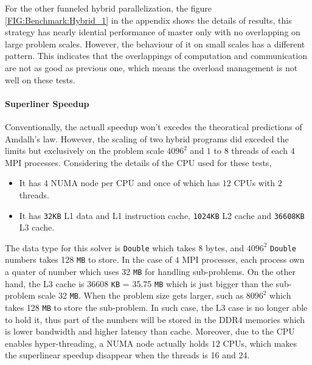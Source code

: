 For the other funneled hybrid parallelization, the figure 
            \ref{FIG:Benchmark:Hybrid_1} 
in the appendix shows the details of results,
this strategy has nearly idential performance of master only with no overlapping on large problem scales.
However, the behaviour of it on small scales has a different pattern.
This indicates that the overlappings of computation and communication are not as good as previous one, which means the overload management is not 
well on these tests.


\paragraph{Superliner Speedup}
Conventionally, the actuall speedup won't excedes the theoratical predictions of Amdalh's law.
However, the scaling of two hybrid programs did exceded the limits but exclusively on the problem scale $4096^2$ and $1$ to $8$ threads of each $4$ MPI processes.
Considering the details of the CPU used for these tests, 
\begin{itemize}
  \item It has $4$ NUMA node per CPU and once of which has $12$ CPUs with $2$ threads.
  \item It has \texttt{32KB} L1 data and L1 instruction cache, \texttt{1024KB} L2 cache and \texttt{36608KB} L3 cache.
\end{itemize}
The data type for this solver is \texttt{Double} which takes $8$ bytes, and $4096^2$ \texttt{Double} numbers takes 128 \texttt{MB} to store.
In the case of $4$ MPI processes, each process own a quater of number which uses 32 \texttt{MB} for handling sub-problems.
On the other hand, the L3 cache is 36608 \texttt{KB} = 35.75 \texttt{MB} which is just bigger than the sub-problem scale 32 \texttt{MB}.
When the problem size gets larger, such as $8096^2$ which takes 128 \texttt{MB} to store the sub-problem. 
In such case, the L3 case is no longer able to hold it, thus part of the numbers will be stored in the DDR4 memories which is lower bandwidth and higher latency than cache.
Moreover, due to the CPU enables hyper-threading, a NUMA node actually holds $12$ CPUs, which makes the 
superlinear speedup disappear when the threads is 16 and 24.


